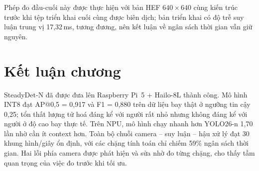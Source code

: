 Phép đo đầu-cuối này được thực hiện với bản HEF $640\times640$ cùng kiến trúc trước khi tệp triển khai cuối cùng được biên dịch; bản triển khai có độ trễ suy luận trung vị 17,32\,ms, tương đương, nên kết luận về ngân sách thời gian vẫn giữ nguyên.

\section{Kết luận chương}

SteadyDet-N đã được đưa lên Raspberry Pi~5 + Hailo-8L thành công. Mô hình INT8 đạt AP@0,5 = 0,917 và F1 = 0,880 trên dữ liệu bay thật ở ngưỡng tin cậy 0,25; tổn thất lượng tử hoá đáng kể với người rất nhỏ nhưng không đáng kể với người ở độ cao bay thực tế. Trên NPU, mô hình chạy nhanh hơn YOLO26-n 1,70 lần nhờ cần ít context hơn. Toàn bộ chuỗi camera -- suy luận -- hậu xử lý đạt 30 khung hình/giây ổn định, với các chặng tính toán chỉ chiếm 59\% ngân sách thời gian. Hai lỗi phía camera được phát hiện và sửa nhờ đo từng chặng, cho thấy tầm quan trọng của việc đo trước khi tối ưu.
